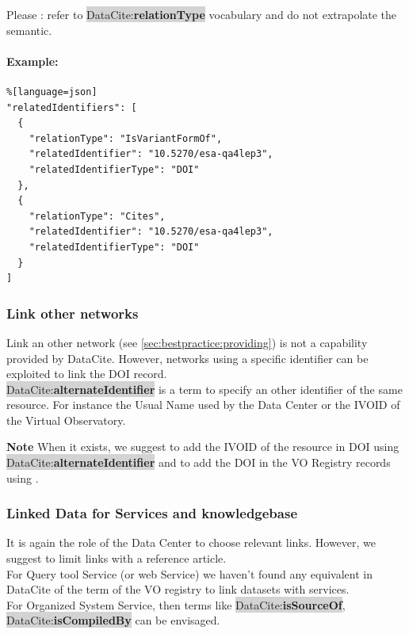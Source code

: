 \documentclass[11pt,a4paper]{ivoa}
\newcommand{\dataciteterm}[1]{\colorbox{lightgray}{DataCite:\textbf{#1}}}
\newcommand{\important}[1]{
	\begin{bigdescription}
		\item \color{ivoacolor}\textbf{Note} #1
	\end{bigdescription}
}
\begin{document}
Please : refer to \dataciteterm{relationType} vocabulary and do not extrapolate the semantic.



\paragraph{Example:}
\begin{lstlisting}%[language=json]
"relatedIdentifiers": [
  {
    "relationType": "IsVariantFormOf",
    "relatedIdentifier": "10.5270/esa-qa4lep3",
    "relatedIdentifierType": "DOI"
  },
  {
    "relationType": "Cites",
    "relatedIdentifier": "10.5270/esa-qa4lep3",
    "relatedIdentifierType": "DOI"
  }
]
\end{lstlisting}

\subsubsection{Link other networks}
\label{sec:altidentifier}
Link an other network (see \ref{sec:bestpractice:providing}) is not a capability provided by DataCite.
However, networks using a specific identifier can be exploited to link the DOI record.\\
\dataciteterm{alternateIdentifier} is a term to specify an other identifier of the same resource. For instance the Usual Name used by the Data Center or the IVOID of the Virtual Observatory.

\important{When it exists, we suggest to add the IVOID of the resource in DOI using \dataciteterm{alternateIdentifier} and to add the DOI in the VO Registry records using \vorent{altIdentifier}.}

\subsubsection{Linked Data for Services and knowledgebase}
\label{sec:linkedataServiceKnowledgebase}
It is again the role of the Data Center to choose relevant links. However, we suggest to limit links with a reference article.\\

For Query tool Service (or web Service) we haven't found any equivalent in DataCite of the  term of the VO registry to link datasets with services. \\

For Organized System Service, then terms like \dataciteterm{isSourceOf}, \dataciteterm{isCompiledBy} can be envisaged.
\end{document}
